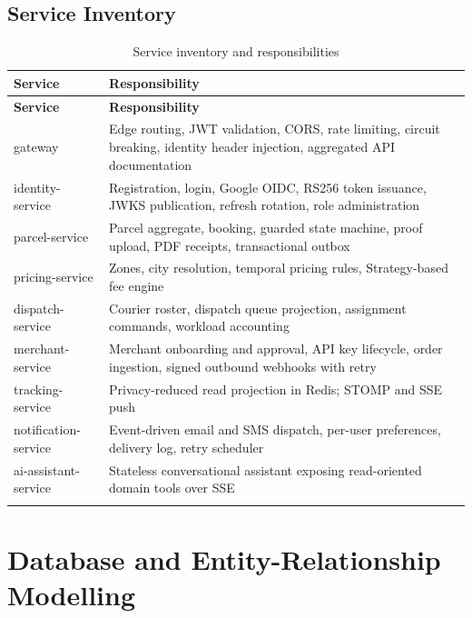 \documentclass[11pt,a4paper,oneside,openany]{report}
\begin{document}
\section{Service Inventory}
\begin{center}
\small
\begin{longtable}{@{}p{3.5cm}p{10.8cm}@{}}
\toprule
\textbf{Service} & \textbf{Responsibility} \\
\midrule
\endfirsthead
\toprule
\textbf{Service} & \textbf{Responsibility} \\
\midrule
\endhead
gateway & Edge routing, JWT validation, CORS, rate limiting, circuit breaking, identity header
injection, aggregated API documentation \\
\addlinespace
identity-service & Registration, login, Google OIDC, RS256 token issuance, JWKS publication,
refresh rotation, role administration \\
\addlinespace
parcel-service & Parcel aggregate, booking, guarded state machine, proof upload, PDF receipts,
transactional outbox \\
\addlinespace
pricing-service & Zones, city resolution, temporal pricing rules, Strategy-based fee engine \\
\addlinespace
dispatch-service & Courier roster, dispatch queue projection, assignment commands, workload
accounting \\
\addlinespace
merchant-service & Merchant onboarding and approval, API key lifecycle, order ingestion, signed
outbound webhooks with retry \\
\addlinespace
tracking-service & Privacy-reduced read projection in Redis; STOMP and SSE push \\
\addlinespace
notification-service & Event-driven email and SMS dispatch, per-user preferences, delivery log,
retry scheduler \\
\addlinespace
ai-assistant-service & Stateless conversational assistant exposing read-oriented domain tools over
SSE \\
\bottomrule
\caption{Service inventory and responsibilities}\label{tab:services}
\end{longtable}
\end{center}

\chapter{Database and Entity-Relationship Modelling}
\end{document}

